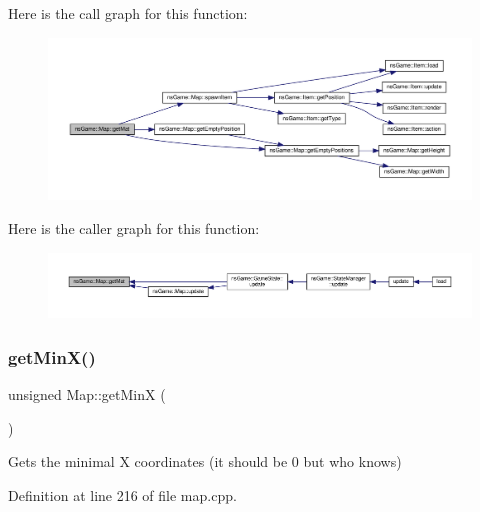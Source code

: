 Here is the call graph for this function\+:\nopagebreak
\begin{figure}[H]
\begin{center}
\leavevmode
\includegraphics[width=350pt]{classns_game_1_1_map_a2cbbebf0522026dff6cfbb0236fe5150_cgraph}
\end{center}
\end{figure}
Here is the caller graph for this function\+:\nopagebreak
\begin{figure}[H]
\begin{center}
\leavevmode
\includegraphics[width=350pt]{classns_game_1_1_map_a2cbbebf0522026dff6cfbb0236fe5150_icgraph}
\end{center}
\end{figure}
\mbox{\label{classns_game_1_1_map_ad3a11fea3eca423e6a1784078b379f84}} 
\subsubsection{\texorpdfstring{get\+Min\+X()}{getMinX()}}
{\footnotesize\ttfamily unsigned Map\+::get\+MinX (\begin{DoxyParamCaption}{ }\end{DoxyParamCaption})}



Gets the minimal X coordinates (it should be 0 but who knows) 



Definition at line 216 of file map.\+cpp.

\mbox{\label{classns_game_1_1_map_a07b09c358fb25b0dea037994e8867d09}} 
